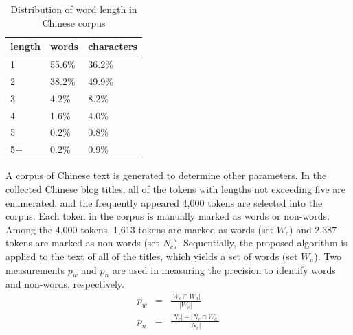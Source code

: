 \documentclass[review,3p,times,12pt,number]{elsarticle}
\begin{document}
\begin{table}[htbp]
\caption{Distribution of word length in Chinese corpus}
\label{weibo:tab:wl}
\center
\begin{tabular} {l l l}
\hline
length & words  & characters\\
\hline
1      & 55.6\% & 36.2\%\\
2      & 38.2\% & 49.9\%\\
3      & 4.2\%  & 8.2\%\\
4      & 1.6\%  & 4.0\%\\
5      & 0.2\%  & 0.8\%\\
5+     & 0.2\%  & 0.9\%\\
\hline
\end{tabular}
\end{table}

A corpus of Chinese text is generated to determine other parameters. In the collected Chinese blog titles, all of the tokens with lengths not exceeding five are enumerated, and the frequently appeared 4,000 tokens are selected into the corpus. Each token in the corpus is manually marked as words or non-words. Among the 4,000 tokens, 1,613 tokens are marked as words (set $W_c$) and 2,387 tokens are marked as non-words (set $N_c$). Sequentially,
the proposed algorithm is applied to the text of all of the titles, which yields a set of words (set $W_a$).
Two measurements $p_w$ and $p_n$ are used in measuring the precision to identify words and non-words, respectively.
\begin{eqnarray*}
p_w & = &  \frac{|W_c\cap W_a|}{|W_c|}\\
p_n & = &  \frac{|N_c|-|N_c\cap W_a|}{|N_c|}\\
\end{eqnarray*}
\end{document}
